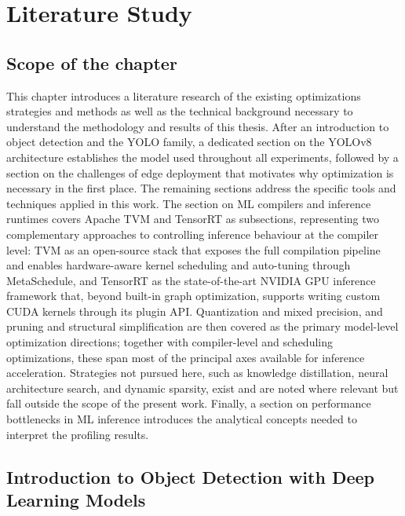 \documentclass[12pt,a4paper]{report}
\begin{document}
\chapter{Literature Study}
\noindent


\section{Scope of the chapter}

This chapter introduces a literature research of the existing optimizations strategies and methods as well as
the technical background necessary to understand the methodology and results of this thesis.
After an introduction to object detection and the YOLO family, a dedicated section on the YOLOv8 architecture
establishes the model used throughout all experiments, followed by a section on the challenges of edge deployment
that motivates why optimization is necessary in the first place.
The remaining sections address the specific tools and techniques applied in this work.
The section on ML compilers and inference runtimes covers Apache TVM and TensorRT as subsections,
representing two complementary approaches to controlling inference behaviour at the compiler level:
TVM as an open-source stack that exposes the full compilation pipeline and enables hardware-aware kernel
scheduling and auto-tuning through MetaSchedule, and TensorRT as the state-of-the-art NVIDIA GPU inference
framework that, beyond built-in graph optimization, supports writing custom CUDA kernels through its plugin API.
Quantization and mixed precision, and pruning and structural simplification are then covered as the primary
model-level optimization directions; together with compiler-level and scheduling optimizations, these span most
of the principal axes available for inference acceleration.
Strategies not pursued here, such as knowledge distillation, neural architecture search, and dynamic sparsity,
exist and are noted where relevant but fall outside the scope of the present work.
Finally, a section on performance bottlenecks in ML inference introduces the analytical concepts needed to
interpret the profiling results.


\section{Introduction to Object Detection with Deep Learning Models}
\end{document}
